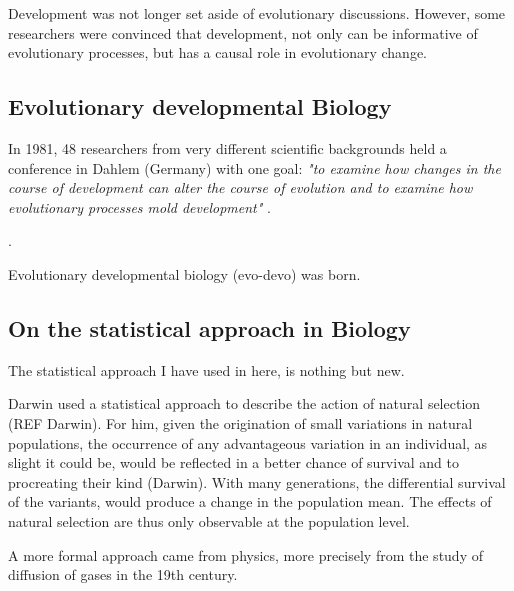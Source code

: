 Development was not longer set aside of evolutionary discussions. However, some researchers were convinced that development, not only can be informative of evolutionary processes, but has a causal role in evolutionary change.

\subsection{Evolutionary developmental Biology}

In 1981, 48 researchers from very different scientific backgrounds 
held a conference in Dahlem (Germany) with one goal: 
\textit{"to examine how changes in the course of development can alter the course of evolution and to examine how evolutionary processes mold development"} \citep{bonner1982evolution}.

\citep{Love2009}.



Evolutionary developmental biology (evo-devo) was born.



\subsection{On the statistical approach in Biology}
The statistical approach I have used in here, is nothing but new.

Darwin used a statistical approach to describe the action of natural selection (REF Darwin). For him, given the origination of small variations in natural populations, the occurrence of any advantageous variation in an individual, as slight it could be, would be reflected in a better chance of survival and to procreating their kind (Darwin). With many generations, the differential survival of the variants, would produce a change in the population mean. 
The effects of natural selection are thus only observable at the population level.

A more formal approach came from physics, more precisely from the study of diffusion of gases in the 19th century.

